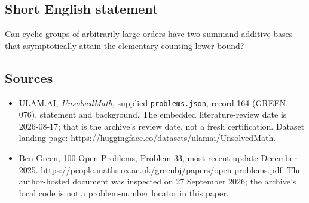 \documentclass[11pt,a4paper]{article}
\begin{document}
\subsection{Short English statement}

Can cyclic groups of arbitrarily large orders have two-summand additive bases that asymptotically attain the elementary counting lower bound?

\subsection{Sources}

{\small

\begin{itemize}

\item[\hypertarget{source:164:1}{S1}] ULAM.AI, \emph{UnsolvedMath}, supplied \texttt{problems.json}, record 164 (GREEN-076), statement and background. The embedded literature-review date is 2026-08-17; that is the archive’s review date, not a fresh certification. Dataset landing page: \url{https://huggingface.co/datasets/ulamai/UnsolvedMath}.

\item[\hypertarget{source:164:2}{S2}] Ben Green, 100 Open Problems, Problem 33, most recent update December 2025. \url{https://people.maths.ox.ac.uk/greenbj/papers/open-problems.pdf}. The author-hosted document was inspected on 27 September 2026; the archive’s local code is not a problem-number locator in this paper.

\end{itemize}

}

\label{end:164}
\end{document}
